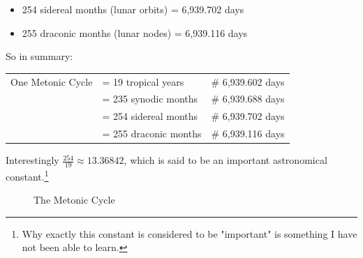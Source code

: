 \documentclass[11pt, oneside]{article}   	%
\theoremstyle{definition}
\begin{document}
\bigskip
\begin{itemize}
  \item 254 sidereal months (lunar orbits) = 6,939.702 days
  \item 255 draconic months (lunar nodes) = 6,939.116 days
\end{itemize}

\bigskip
\noindent
So in  summary: 

\begin{flushleft}
\begin{tabular}{@{}l@{\ }l@{\qquad}l}
  One Metonic Cycle
  & = 19 tropical years&              \# 6,939.602 days \\
  & = 235 synodic months&        \# 6,939.688 days \\
  & = 254 sidereal months&        \# 6,939.702 days \\
  & = 255 draconic months&       \# 6,939.116 days \\
\end{tabular}
\end{flushleft}




\bigskip
\noindent
Interestingly $\frac{254}{19} \approx 13.36842$,  which is said to be an important astronomical constant.\footnote{Why exactly this 
constant is considered to be "important" is something I have not been able to learn.}

\bigskip
\bigskip
\begin{figure}[H]
  \caption{The Metonic Cycle \cite{youtube:freeth2021}}
  \label{fig:metonic_cycle}
\end{figure}
\end{document}
